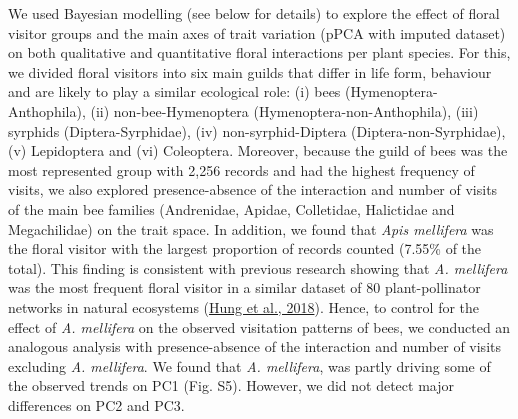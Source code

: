 \documentclass[
  12pt,
  a4paper,
]{article}
\begin{document}
We used Bayesian modelling (see below for details) to explore the effect of floral visitor groups and the main axes of trait variation (pPCA with imputed dataset) on both qualitative and quantitative floral interactions per plant species. For this, we divided floral visitors into six main guilds that differ in life form, behaviour and are likely to play a similar ecological role: (i) bees (Hymenoptera-Anthophila), (ii) non-bee-Hymenoptera (Hymenoptera-non-Anthophila), (iii) syrphids (Diptera-Syrphidae), (iv) non-syrphid-Diptera (Diptera-non-Syrphidae), (v) Lepidoptera and (vi) Coleoptera. Moreover, because the guild of bees was the most represented group with 2,256 records and had the highest frequency of visits, we also explored presence-absence of the interaction and number of visits of the main bee families (Andrenidae, Apidae, Colletidae, Halictidae and Megachilidae) on the trait space. In addition, we found that \emph{Apis mellifera} was the floral visitor with the largest proportion of records counted (7.55\% of the total). This finding is consistent with previous research showing that \emph{A. mellifera} was the most frequent floral visitor in a similar dataset of 80 plant-pollinator networks in natural ecosystems (\protect\hyperlink{ref-hung2018}{Hung et al., 2018}). Hence, to control for the effect of \emph{A. mellifera} on the observed visitation patterns of bees, we conducted an analogous analysis with presence-absence of the interaction and number of visits excluding \emph{A. mellifera}. We found that \emph{A. mellifera}, was partly driving some of the observed trends on PC1 (Fig. S5). However, we did not detect major differences on PC2 and PC3.
\end{document}

